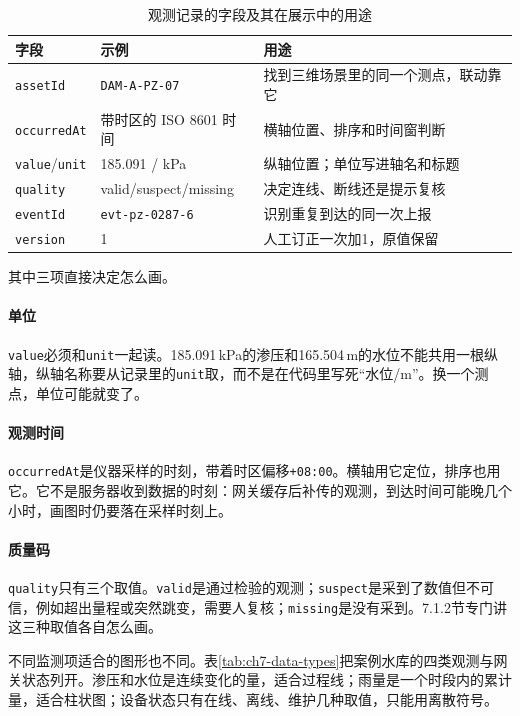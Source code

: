 \begin{table}[htbp]
\centering
\caption{观测记录的字段及其在展示中的用途}
\label{tab:ch7-view-contract}
\begin{tabular}{p{2.7cm}p{4.2cm}p{5.5cm}}
\toprule
字段 & 示例 & 用途 \\
\midrule
\texttt{assetId} & \texttt{DAM-A-PZ-07} & 找到三维场景里的同一个测点，联动靠它 \\
\texttt{occurredAt} & 带时区的 ISO 8601 时间 & 横轴位置、排序和时间窗判断 \\
\texttt{value}/\texttt{unit} & 185.091 / kPa & 纵轴位置；单位写进轴名和标题 \\
\texttt{quality} & valid/suspect/missing & 决定连线、断线还是提示复核 \\
\texttt{eventId} & \texttt{evt-pz-0287-6} & 识别重复到达的同一次上报 \\
\texttt{version} & 1 & 人工订正一次加1，原值保留 \\
\bottomrule
\end{tabular}
\end{table}

其中三项直接决定怎么画。

\paragraph{单位}\texttt{value}必须和\texttt{unit}一起读。185.091\,kPa的渗压和165.504\,m的水位不能共用一根纵轴，纵轴名称要从记录里的\texttt{unit}取，而不是在代码里写死“水位/m”。换一个测点，单位可能就变了。

\paragraph{观测时间}\texttt{occurredAt}是仪器采样的时刻，带着时区偏移\texttt{+08:00}。横轴用它定位，排序也用它。它不是服务器收到数据的时刻：网关缓存后补传的观测，到达时间可能晚几个小时，画图时仍要落在采样时刻上。

\paragraph{质量码}\texttt{quality}只有三个取值。\texttt{valid}是通过检验的观测；\texttt{suspect}是采到了数值但不可信，例如超出量程或突然跳变，需要人复核；\texttt{missing}是没有采到。7.1.2节专门讲这三种取值各自怎么画。

不同监测项适合的图形也不同。表\ref{tab:ch7-data-types}把案例水库的四类观测与网关状态列开。渗压和水位是连续变化的量，适合过程线；雨量是一个时段内的累计量，适合柱状图；设备状态只有在线、离线、维护几种取值，只能用离散符号。

